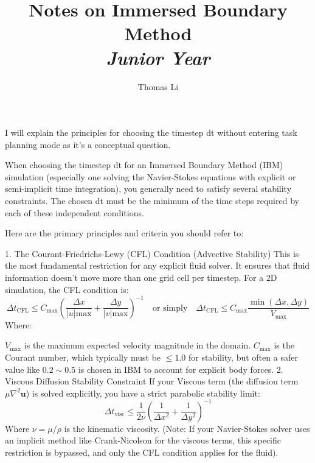 \documentclass{article}
\begin{document}
\title{{Notes on Immersed Boundary Method}\\{\normalsize{\itshape Junior Year}}}
	\author{Thomas Li}
	\maketitle
    \pagestyle{fancynotes}
	\newpage



\newpage


I will explain the principles for choosing the timestep dt without entering task planning mode as it's a conceptual question.

When choosing the timestep dt for an Immersed Boundary Method (IBM) simulation (especially one solving the Navier-Stokes equations with explicit or semi-implicit time integration), you generally need to satisfy several stability constraints. The chosen dt must be the minimum of the time steps required by each of these independent conditions.

Here are the primary principles and criteria you should refer to:

1. The Courant-Friedrichs-Lewy (CFL) Condition (Advective Stability)
This is the most fundamental restriction for any explicit fluid solver. It ensures that fluid information doesn't move more than one grid cell per timestep. For a 2D simulation, the CFL condition is: $$ \Delta t_{\text{CFL}} \le C_{\text{max}} \left( \frac{\Delta x}{|u|{\text{max}}} + \frac{\Delta y}{|v|{\text{max}}} \right)^{-1} \quad \text{or simply} \quad \Delta t_{\text{CFL}} \le C_{\text{max}} \frac{\min(\Delta x, \Delta y)}{V_{\text{max}}} $$ Where:

$V_{\text{max}}$ is the maximum expected velocity magnitude in the domain.
$C_{\text{max}}$ is the Courant number, which typically must be $\le 1.0$ for stability, but often a safer value like $0.2 \sim 0.5$ is chosen in IBM to account for explicit body forces.
2. Viscous Diffusion Stability Constraint
If your Viscous term (the diffusion term $\mu \nabla^2 \mathbf{u}$) is solved explicitly, you have a strict parabolic stability limit: $$ \Delta t_{\text{visc}} \le \frac{1}{2 \nu} \left( \frac{1}{\Delta x^2} + \frac{1}{\Delta y^2} \right)^{-1} $$ Where $\nu = \mu / \rho$ is the kinematic viscosity. (Note: If your Navier-Stokes solver uses an implicit method like Crank-Nicolson for the viscous terms, this specific restriction is bypassed, and only the CFL condition applies for the fluid).
\end{document}
